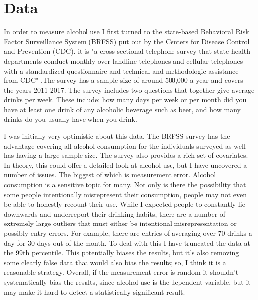 \documentclass[11pt]{article}
\begin{document}

\section{Data}

In order to measure alcohol use I first turned to the state-based Behavioral Risk Factor Surveillance System (BRFSS) put out by the Centers for Disease Control and Prevention (CDC). it is "a cross-sectional telephone survey that state health departments conduct monthly over landline telephones and cellular telephones with a standardized questionnaire and technical and methodologic assistance from CDC" \cite{BRFSS_homepage}.The survey has a sample size of around 500,000 a year and covers the years 2011-2017. The survey includes two questions that together give average drinks per week. These include: how many days per week or per month did you have at least one drink of any alcoholic beverage such as beer, and how many drinks do you usually have when you drink. \par


I was initially very optimistic about this data. The BRFSS survey has the advantage covering all alcohol consumption for the individuals surveyed as well has having a large sample size. The survey also provides a rich set of covariates. In theory, this could offer a detailed look at alcohol use, but I have uncovered a number of issues. The biggest of which is measurement error. Alcohol consumption is a sensitive topic for many. Not only is there the possibility that some people intentionally misrepresent their consumption, people may not even be able to honestly recount their use. While I expected people to constantly lie downwards and underreport their drinking habits, there are a number of extremely large outliers that must either be intentional misrepresentation or possibly entry errors. For example, there are entries of averaging over 70 drinks a day for 30 days out of the month. To deal with this I have truncated the data at the 99th percentile. This potentially biases the results, but it's also removing some clearly false data that would also bias the results; so, I think it is a reasonable strategy. Overall, if the measurement error is random it shouldn't systematically bias the results, since alcohol use is the dependent variable, but it may make it hard to detect a statistically significant result. \par
\end{document}

